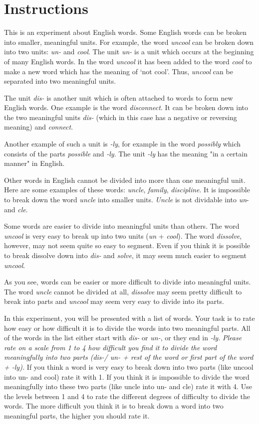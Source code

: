 \section{Instructions}
 This is an experiment about English words. Some English words can be broken into smaller, meaningful units.
For example, the word \textit{uncool} can be broken down into two units: \textit{un-} and \textit{cool}. The unit \textit{{un-} }is a unit which occurs at the beginning of many English words. In the word \textit{uncool} it has been added to the word \textit{cool} to make a new word which has the meaning of ‘not cool’. Thus, \textit{uncool} can be separated into two meaningful units.

The unit \textit{dis-} is another unit which is often attached to words to form new English words. One example is the word \textit{disconnect}. It can be broken down into the two meaningful units \textit{{dis-} }(which in this case has a negative or reversing meaning) and \textit{connect}.

Another example of such a unit is \textit{-ly}, for example in the word \textit{possibly} which consists of the parts \textit{possible} and \textit{-ly}.  The unit\textit{ {-ly} }has the meaning "in a certain manner" in English.

Other words in English cannot be divided into more than one meaningful unit. Here are some examples of these words: \textit{uncle}, \textit{family}, \textit{discipline}. It is impossible to break down the word \textit{uncle} into smaller units. \textit{Uncle} is not dividable into \textit{un}- and \textit{cle}.

Some words are easier to divide into meaningful units than others. The word \textit{uncool} is very easy to break up into two units (\textit{un} + \textit{cool}). The word \textit{dissolve}, however, may not seem quite so easy to segment. Even if you think it is possible to break dissolve down into \textit{dis-} and \textit{solve}, it may seem much easier to segment \textit{uncool}.

As you see, words can be easier or more difficult to divide into meaningful units. The word \textit{uncle} cannot be divided at all, \textit{dissolve} may seem pretty difficult to break into parts and \textit{uncool} may seem very easy to divide into its parts. 

In this experiment, you will be presented with a list of words. Your task is to rate how easy or how difficult it is to divide the words into two meaningful parts. All of the words in the list either start with \textit{dis-} or \textit{un-}, or they end in \textit{{-ly}.} \emph{Please rate on a scale from 1 to 4 how difficult you find it to divide the word meaningfully into two parts (\textit{{dis-}/ un-} + rest of the word or first part of the word + \textit{-ly}).} If you think a word is very easy to break down into two parts (like uncool into {un-} and cool) rate it with 1.  If you think it is impossible to divide the word meaningfully into these two parts (like uncle into {un-} and cle) rate it with 4. Use the levels between 1 and 4 to rate the different degrees of difficulty to divide the words. The more difficult you think it is to break down a word into two meaningful parts, the higher you should rate it.

